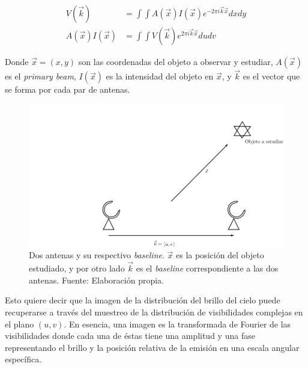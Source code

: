 \begin{align}
V(\vec{k}) &= \int\int A(\vec{x})I(\vec{x})e^{-2\pi i\vec{k}\vec{x}}dxdy \\
A(\vec{x})I(\vec{x}) &= \int\int V(\vec{k})e^{2\pi i\vec{k}\vec{x}}dudv
\end{align}

Donde $\vec{x} = (x,y)$ son las coordenadas del objeto a observar y estudiar, $A(\vec{x})$ es el \textit{primary beam}, $I(\vec{x})$ es la intensidad del objeto en $\vec{x}$, y $\vec{k}$ es el vector que se forma por cada par de antenas.

\begin{figure}[h!]
\centering
\includegraphics[scale=0.4]{images/antenas.png}
\caption{Dos antenas y su respectivo \textit{baseline}. $\vec{x}$ es la posición del objeto estudiado, y por otro lado $\vec{k}$ es el \textit{baseline} correspondiente a las dos antenas. Fuente: Elaboración propia.}
\label{fig:antena}
\end{figure}

Esto quiere decir que la imagen de la distribución del brillo del cielo puede recuperarse a través del muestreo de la distribución de visibilidades complejas en el plano $(u,v)$. En esencia, una imagen es la transformada de Fourier de las visibilidades donde cada una de éstas tiene una amplitud y una fase representando el brillo y la posición relativa de la emisión en una escala angular específica.


